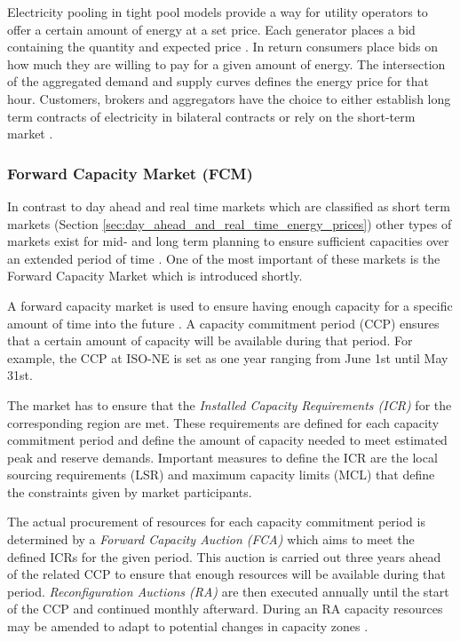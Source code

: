 Electricity pooling in tight pool models provide a way for utility operators to offer a certain amount of energy at a set price. Each generator places a bid containing the quantity and expected price \cite{barroso2005classification}. In return consumers place bids on how much they are willing to pay for a given amount of energy. The intersection of the aggregated demand and supply curves defines the energy price for that hour. 
Customers, brokers and aggregators have the choice to either establish long term contracts of electricity in bilateral contracts or rely on the short-term market \cite{hogan1997reshaping}.



\subsubsection{Forward Capacity Market (FCM)} 

In contrast to day ahead and real time markets which are classified as short term markets (Section \ref{sec:day_ahead_and_real_time_energy_prices}) other types of markets exist for mid- and long term planning to ensure sufficient capacities over an extended period of time \cite{barroso2005classification,nomikos2010modelling,redl2009price}. One of the most important of these markets is the Forward Capacity Market which is introduced shortly. 

A forward capacity market is used to ensure having enough capacity for a specific amount of time into the future \cite{gottstein2010role}. A capacity commitment period (CCP) ensures that a certain amount of capacity will be available during that period. For example, the CCP at ISO-NE is set as one year ranging from June 1st until May 31st. 

The market has to ensure that the \emph{Installed Capacity Requirements (ICR)} for the corresponding region are met. These requirements are defined for each capacity commitment period and define the amount of capacity needed to meet estimated peak and reserve demands. Important measures to define the ICR are the local sourcing requirements (LSR) and maximum capacity limits (MCL) that define the constraints given by market participants. 

The actual procurement of resources for each capacity commitment period is determined by a \emph{Forward Capacity Auction (FCA)} which aims to meet the defined ICRs for the given period.
This auction is carried out three years ahead of the related CCP to ensure that enough resources will be available during that period. \emph{Reconfiguration Auctions (RA)} are then executed annually until the start of the CCP and continued monthly afterward. During an RA capacity resources may be amended to adapt to potential changes in capacity zones \cite{gottstein2010role}. 

